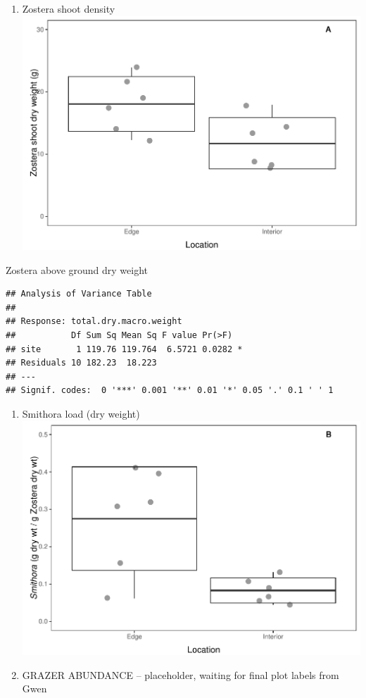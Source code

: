 \documentclass[]{article}
\providecommand{\tightlist}{%
  \setlength{\itemsep}{0pt}\setlength{\parskip}{0pt}}
\begin{document}
\begin{enumerate}
\def\labelenumi{\Alph{enumi})}
\tightlist
\item
  Zostera shoot density
  \includegraphics{Griffiths_et_al_analyses_and_figures_files/figure-latex/unnamed-chunk-9-1.pdf}
\end{enumerate}

Zostera above ground dry weight

\begin{verbatim}
## Analysis of Variance Table
## 
## Response: total.dry.macro.weight
##           Df Sum Sq Mean Sq F value Pr(>F)  
## site       1 119.76 119.764  6.5721 0.0282 *
## Residuals 10 182.23  18.223                 
## ---
## Signif. codes:  0 '***' 0.001 '**' 0.01 '*' 0.05 '.' 0.1 ' ' 1
\end{verbatim}

\begin{enumerate}
\def\labelenumi{\Alph{enumi})}
\setcounter{enumi}{1}
\item
  Smithora load (dry weight)
  \includegraphics{Griffiths_et_al_analyses_and_figures_files/figure-latex/unnamed-chunk-11-1.pdf}
\item
  GRAZER ABUNDANCE -- placeholder, waiting for final plot labels from
  Gwen
\end{enumerate}
\end{document}
